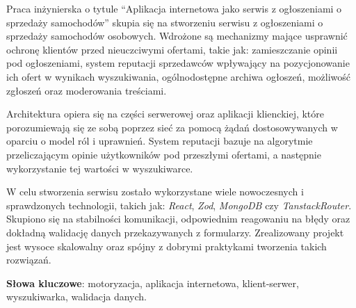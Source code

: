 Praca inżynierska o tytule ``Aplikacja internetowa jako serwis z ogłoszeniami o sprzedaży samochodów'' skupia się na stworzeniu serwisu z ogłoszeniami o sprzedaży samochodów osobowych.
Wdrożone są mechanizmy mające usprawnić ochronę klientów przed nieuczciwymi ofertami, takie jak: zamieszczanie opinii pod ogłoszeniami, system reputacji sprzedawców wpływający na pozycjonowanie ich ofert w wynikach wyszukiwania, ogólnodostępne archiwa ogłoszeń, możliwość zgłoszeń oraz moderowania treściami.

Architektura opiera się na części serwerowej oraz aplikacji klienckiej, które porozumiewają się ze sobą poprzez sieć za pomocą żądań dostosowywanych w oparciu o model ról i uprawnień.
System reputacji bazuje na algorytmie przeliczającym opinie użytkowników pod przeszłymi ofertami, a następnie wykorzystanie tej wartości w wyszukiwarce.

W celu stworzenia serwisu zostało wykorzystane wiele nowoczesnych i sprawdzonych technologii, takich jak: \emph{React}, \emph{Zod}, \emph{MongoDB} czy \emph{TanstackRouter}.
Skupiono się na stabilności komunikacji, odpowiednim reagowaniu na błędy oraz dokładną walidację danych przekazywanych z formularzy.
Zrealizowany projekt jest wysoce skalowalny oraz spójny z dobrymi praktykami tworzenia takich rozwiązań.

\vspace*{1em}

\noindent
\textbf{Słowa kluczowe}: motoryzacja, aplikacja internetowa, klient-serwer, wyszukiwarka, walidacja danych.

